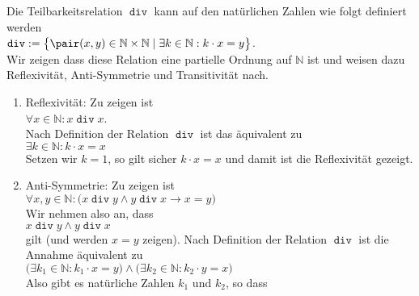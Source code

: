\example 
Die Teilbarkeitsrelation $\mathop{\mathtt{div}}$ kann auf den nat\"{u}rlichen Zahlen
wie folgt definiert werden 
\\[0.2cm]
\hspace*{1.3cm}
$ \mathop{\mathtt{div}} := 
   \bigl\{ \pair(x,y) \in \mathbb{N} \times \mathbb{N} \mid \exists k \in \mathbb{N}: k \cdot x = y\bigr\}$.
\\[0.2cm] 
Wir zeigen dass diese Relation eine partielle Ordnung auf $\mathbb{N}$ ist und weisen dazu
Reflexivit\"{a}t, Anti-Symmetrie und Transitivit\"{a}t nach.
\begin{enumerate}
\item Reflexivit\"{a}t: Zu zeigen ist 
      \\[0.2cm]
      \hspace*{1.3cm}
      $\forall x \in \mathbb{N}: x \mathop{\mathtt{div}} x$.
      \\[0.2cm]
      Nach Definition der Relation $\mathop{\mathtt{div}}$ ist  das \"{a}quivalent zu
      \\[0.2cm]
      \hspace*{1.3cm}
      $\exists k \in \mathbb{N}: k \cdot x = x$ 
      \\[0.2cm]
      Setzen wir $k=1$, so gilt sicher $k \cdot x = x$ und damit ist die Reflexivit\"{a}t
      gezeigt.
\item Anti-Symmetrie: Zu zeigen ist 
      \\[0.2cm]
      \hspace*{1.3cm}
      $\forall x, y \in \mathbb{N}:\bigl( x \mathop{\mathtt{div}} y \wedge y \mathop{\mathtt{div}} x \rightarrow x = y\bigr)$
      \\[0.2cm] 
      Wir nehmen also an, dass 
      \\[0.2cm]
      \hspace*{1.3cm}
      $x \mathop{\mathtt{div}} y \wedge y \mathop{\mathtt{div}} x$
      \\[0.2cm]
      gilt (und werden $x=y$ zeigen).  Nach Definition der Relation $\mathop{\mathtt{div}}$
      ist die Annahme \"{a}quivalent zu 
      \\[0.2cm]
      \hspace*{1.3cm}
      $\bigl(\exists k_1 \in \mathbb{N}: k_1 \cdot x = y \bigr) \wedge
       \bigl(\exists k_2 \in \mathbb{N}: k_2 \cdot y = x \bigr)$ 
      \\[0.2cm]
      Also gibt es nat\"{u}rliche Zahlen $k_1$ und $k_2$, so dass 
      \\[0.2cm]
      \hspace*{1.3cm}

\end{enumerate}
